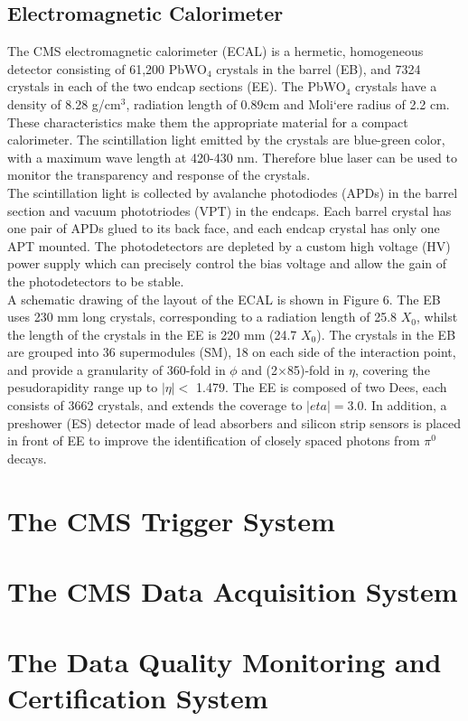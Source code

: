 \documentclass[thesis.tex]{subfiles}
\begin{document}
\subsection{Electromagnetic Calorimeter}
The CMS electromagnetic calorimeter (ECAL) is a hermetic, homogeneous detector consisting of 61,200 PbWO$_4$ crystals in the barrel (EB), and 7324 crystals in each of the two endcap sections (EE). 
The PbWO$_4$ crystals have a density of 8.28 g/cm$^3$, radiation length of 0.89cm and Moli`ere radius of 2.2 cm. 
These characteristics make them the appropriate material for a compact calorimeter. 
The scintillation light emitted by the crystals are blue-green color, with a maximum wave length at 420-430 nm. 
Therefore blue laser can be used to monitor the transparency and response of the crystals. \\

The scintillation light is collected by avalanche photodiodes (APDs) in the barrel section and vacuum phototriodes (VPT) in the endcaps. 
Each barrel crystal has one pair of APDs glued to its back face, and each endcap crystal has only one APT mounted. 
The photodetectors are depleted by a custom high voltage (HV) power supply which can precisely control the bias voltage and allow the gain of the photodetectors to be stable. \\

A schematic drawing of the layout of the ECAL is shown in Figure 6. 
The EB uses 230 mm long crystals, corresponding to a radiation length of 25.8 $X_0$, whilst the length of the crystals in the EE is 220 mm (24.7 $X_0$). 
The crystals in the EB are grouped into 36 supermodules (SM), 18 on each side of the interaction point, and provide a granularity of 360-fold in $\phi$ and (2$\times$85)-fold in $\eta$, covering the pesudorapidity range up to $|\eta| <$ 1.479. 
The EE is composed of two Dees, each consists of 3662 crystals, and extends the coverage to $|eta| = $3.0. 
In addition, a preshower (ES) detector made of lead absorbers and silicon strip sensors is placed in front of EE to improve the identification of closely spaced photons from $\pi^0$ decays. \\


\section{The CMS Trigger System}

\section{The CMS Data Acquisition System}

\section{The Data Quality Monitoring and Certification System}
\end{document}
